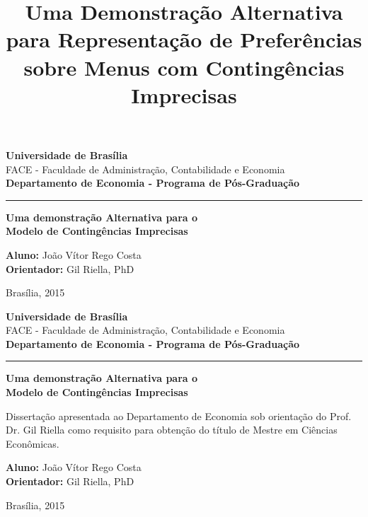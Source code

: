 \documentclass[12pt, a4paper]{article}
\title{Uma Demonstração Alternativa para Representação de Preferências sobre Menus com Contingências Imprecisas}
\author{}
\theoremstyle{nonumberplain}
\theoremstyle{plain}
\theoremstyle{plain}
\theoremstyle{plain}
\theoremstyle{nonumberplain}
\begin{document}
\onehalfspacing
\begin{titlepage}
\begin{flushleft}
\textbf{Universidade de Brasília}\\
FACE - Faculdade de Administração, Contabilidade e Economia\\
\textbf{Departamento de Economia - Programa de Pós-Graduação}

\hrule
\end{flushleft}    

\begin{center}
\vspace*{6cm}
\textbf{\Large Uma demonstração Alternativa para o  \\ Modelo de Contingências Imprecisas}
\end{center}        
\vspace{3.5cm}
\begin{flushright}
\onehalfspacing
\textbf{Aluno:} João Vítor Rego Costa\\
\textbf{Orientador:} Gil Riella, PhD
\end{flushright}
\vfill        
\begin{center}
Brasília, 2015
\end{center}  
\end{titlepage}

\begin{titlepage}
\begin{flushleft}
\textbf{Universidade de Brasília}\\
FACE - Faculdade de Administração, Contabilidade e Economia\\
\textbf{Departamento de Economia - Programa de Pós-Graduação}

\hrule
\end{flushleft}    

\begin{center}
\vspace*{6cm}
\textbf{\large Uma demonstração Alternativa para o  \\ Modelo de Contingências Imprecisas}
\end{center}        
\vspace{1cm}
\begin{flushright}
\begin{minipage}[c]{6cm}
Dissertação apresentada ao Departamento de Economia sob orientação do Prof. Dr. Gil Riella como requisito para obtenção do título de Mestre em Ciências Econômicas.
\end{minipage} 
\end{flushright}
\vspace{1cm}
\begin{flushright}
\onehalfspacing
\textbf{Aluno:} João Vítor Rego Costa\\
\textbf{Orientador:} Gil Riella, PhD
\end{flushright}
\vfill        
\begin{center}
Brasília, 2015
\end{center}  
\end{titlepage}
\end{document}
